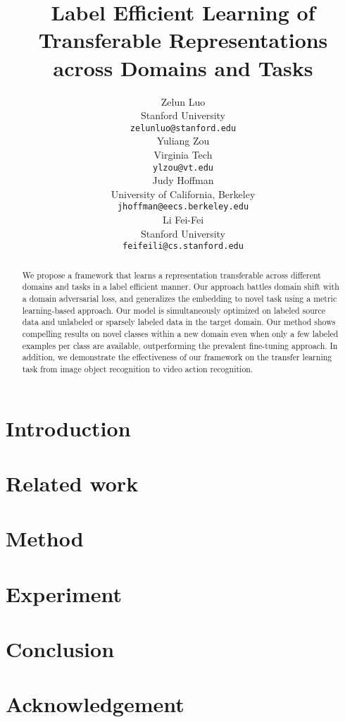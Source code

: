 \documentclass{article}
\title{Label Efficient Learning of Transferable Representations across Domains and Tasks}
\author{
  Zelun Luo \\
  Stanford University \\
  \texttt{zelunluo@stanford.edu} \\
  \And
  Yuliang Zou \\
  Virginia Tech \\
  \texttt{ylzou@vt.edu} \\
  \AND
  \hspace{0.8cm} Judy Hoffman \\
  \hspace{0.5cm} University of California, Berkeley \\
  \hspace{0.5cm} \texttt{jhoffman@eecs.berkeley.edu} \\
  \And
  \hspace{-0.4cm} Li Fei-Fei \\
  \hspace{-0.4cm} Stanford University \\
  \hspace{-0.4cm} \texttt{feifeili@cs.stanford.edu} \\
}
\begin{document}

\maketitle

\begin{abstract}
We propose a framework that learns a representation transferable across different domains and tasks in a label efficient manner. Our approach battles domain shift with a domain adversarial loss, and generalizes the embedding to novel task using a metric learning-based approach. Our model is simultaneously optimized on labeled source data and unlabeled or sparsely labeled data in the target domain. Our method shows compelling results on novel classes within a new domain even when only a few labeled examples per class are available, outperforming the prevalent fine-tuning approach. In addition, we demonstrate the effectiveness of our framework on the transfer learning task from image object recognition to video action recognition. 
\end{abstract}

\section{Introduction}



\section{Related work}


\section{Method}


\section{Experiment}


\section{Conclusion}


\section*{Acknowledgement}

\end{document}

